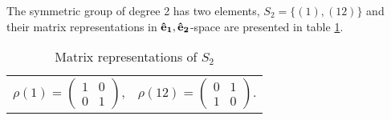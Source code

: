 	\begin{example}
		The symmetric group of degree 2 has two elements, $S_2 = \{(1), (12)\}$ and their matrix representations in $\mathbf{\mathbf{\hat{e}}_1},\mathbf{\mathbf{\hat{e}}_2}$-space are presented in table \ref{table:permS2}.
		\begin{table}[hbt!]
			\centering
			\begin{tabular}{c c}
				$\rho(1) =
				\begin{pmatrix}
					1 & 0 \\ 0 & 1
				\end{pmatrix}$, &
				$\rho(12) =
				\begin{pmatrix}
					0 & 1 \\ 1 & 0
				\end{pmatrix}$.
			\end{tabular}
			\caption{Matrix representations of $S_2$}
			\label{table:permS2}
		\end{table}
	\end{example}
	
